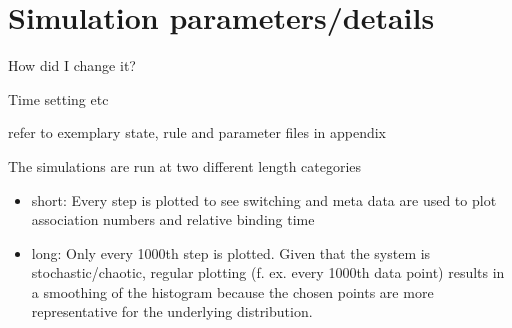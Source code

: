     \section{Simulation parameters/details}
        \begin{itemize}
            {
                \color{red}
                \item How did I change it?
                \item Time setting etc
                \item refer to exemplary state, rule and parameter files in appendix
                \item The simulations are run at two different length categories
                    \begin{itemize}
                        \item short: Every step is plotted to see switching and meta data are used to plot association numbers and relative binding time
                        \item long: Only every 1000th step is plotted. Given that the system is stochastic/chaotic, regular plotting (f. ex. every 1000th data point) results in a smoothing of the histogram because the chosen points are more representative for the underlying distribution.
                    \end{itemize}
            }
        \end{itemize}
%
%
